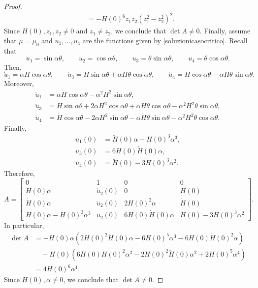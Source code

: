 \documentclass[10pt,a4paper]{amsart}
\begin{document}
\begin{proof}
\begin{equation*}
\begin{split}
	&=-H(0)^6z_1z_2\left(z_1^2-z_2^2\right)^2.
\end{split}
\end{equation*}
Since $H(0),z_1,z_2\neq 0$ and $z_1\neq z_2$, we conclude that $\det A\neq 0$. Finally, assume that $\mu=\mu_0$ and $u_1,\ldots,u_4$ are the functions given by \eqref{soluzionicasocritico}. Recall that 
\begin{equation*}
u_1=\sin \alpha \theta,\qquad
u_2=\cos\alpha\theta,\qquad
u_3= \theta\sin\alpha \theta,\qquad
u_4=\theta\cos\alpha\theta.
\end{equation*}
Then,
\begin{equation*}
\dot u_1=\alpha H\cos\alpha\theta,\qquad\dot u_3=H\sin\alpha\theta+\alpha H\theta\cos\alpha\theta,\qquad \dot u_4 =H\cos\alpha\theta-\alpha H\theta\sin\alpha\theta.
\end{equation*}
Moreover,
\begin{align*}
\ddot u_1&=\alpha\dot H\cos\alpha\theta-\alpha^2H^2\sin\alpha\theta,\\
\ddot u_3&=\dot H\sin\alpha\theta+2\alpha H^2\cos\alpha\theta+\alpha\dot H\theta\cos\alpha\theta-\alpha^2 H^2\theta\sin\alpha\theta,\\
\ddot u_4&=\dot H\cos\alpha\theta-2\alpha H^2\sin\alpha\theta-\alpha\dot H\theta\sin\alpha\theta-\alpha^2H^2\theta\cos\alpha\theta.
\end{align*}
Finally,
\begin{align*}
\dddot u_1(0)&=\ddot H(0)\alpha-H(0)^3\alpha^3,\\
\dddot u_3(0)&=6H(0)\dot H(0)\alpha,\\
\dddot u_4(0)&=\ddot H(0)-3H(0)^3\alpha^2.
\end{align*}
Therefore, 
\begin{equation*}
A=\begin{bmatrix}
	0 & 1 & 0 & 0 \\
	H(0)\alpha & \dot u_2(0) & 0 & H(0) \\
	\dot H(0)\alpha & \ddot u_2(0) & 2H(0)^2\alpha & \dot H(0) \\
	\ddot H(0)\alpha-H(0)^3\alpha^3 & \dddot u_2(0) & 6H(0)\dot H(0)\alpha & \ddot H(0)-3H(0)^3\alpha^2
\end{bmatrix}.
\end{equation*}
In particular,
\begin{equation*}
\begin{split}
	\det A&=-H(0)\alpha\left(2H(0)^2\ddot H(0)\alpha-6H(0)^5\alpha^3-6H(0)\dot H(0)^2\alpha\right)\\
	&\quad-H(0)\left(6H(0)\dot H(0)^2\alpha^2-2H(0)^2\ddot H(0)\alpha^2+2H(0)^5\alpha^4\right)\\
	&=4 H(0)^6\alpha^4.
\end{split}
\end{equation*}
Since $H(0),\alpha\neq 0$, we conclude that $\det A\neq 0$.
\end{proof}
\end{document}

